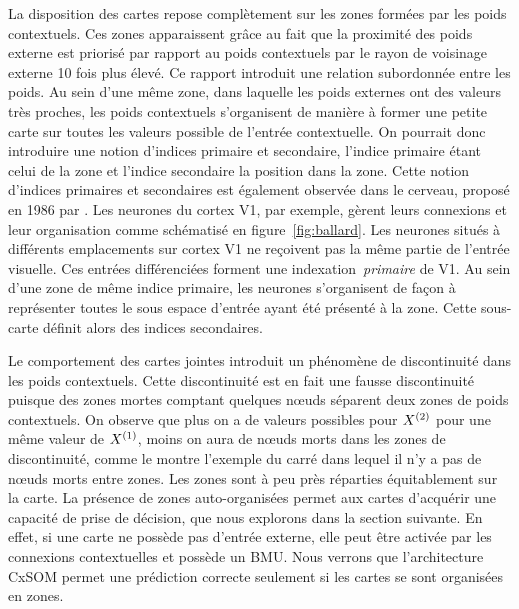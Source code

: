 \documentclass[../main]{subfiles}
\begin{document}
La disposition des cartes repose complètement sur les zones formées par les poids contextuels. Ces zones apparaissent grâce au fait que la proximité des poids externe est priorisé par rapport au poids contextuels par le rayon de voisinage externe 10 fois plus élevé. Ce rapport introduit une relation subordonnée entre les poids. 
Au sein d'une même zone, dans laquelle les poids externes ont des valeurs très proches, les poids contextuels s'organisent de manière à former une petite carte sur toutes les valeurs possible de l'entrée contextuelle.
On pourrait donc introduire une notion d'indices primaire et secondaire, l'indice primaire étant celui de la zone et l'indice secondaire la position dans la zone.
Cette notion d'indices primaires et secondaires est également observée dans le cerveau, proposé en 1986 par \cite{ballard_cortical_1986}. Les neurones du cortex V1, par exemple, gèrent leurs connexions et leur organisation comme schématisé en figure~\ref{fig:ballard}.
Les neurones situés à différents emplacements sur cortex V1 ne reçoivent pas la même partie de l'entrée visuelle. Ces entrées différenciées forment une indexation~\emph{primaire} de V1. Au sein d'une zone de même indice primaire, les neurones s'organisent de façon à représenter toutes le sous espace d'entrée ayant été présenté à la zone. Cette sous-carte définit alors des indices secondaires.

Le comportement des cartes jointes introduit un phénomène de discontinuité dans les poids contextuels. Cette discontinuité est en fait une fausse discontinuité puisque des zones mortes comptant quelques n\oe{}uds séparent deux zones de poids contextuels.
On observe que plus on a de valeurs possibles pour $X^{({2})}$ pour une même valeur de $X^{({1})}$, moins on aura de n\oe{}uds morts dans les zones de discontinuité, comme le montre l'exemple du carré dans lequel il n'y a pas de n\oe{}uds morts entre zones.
Les zones sont à peu près réparties équitablement sur la carte.
La présence de zones auto-organisées permet aux cartes d'acquérir une capacité de prise de décision, que nous explorons dans la section suivante.
En effet, si une carte ne possède pas d'entrée externe, elle peut être activée par les connexions contextuelles et possède un BMU. Nous verrons que l'architecture CxSOM permet une prédiction correcte seulement si les cartes se sont organisées en zones.
\end{document}
